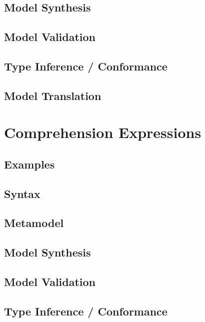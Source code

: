 \documentclass[a4paper,oneside,12pt, extrafontsizes]{memoir}
\begin{document}
    \section{Model Synthesis}

    \section{Model Validation}

    \section{Type Inference / Conformance}

    \section{Model Translation}

  \chapter{Comprehension Expressions}
  \label{ch:comprehensions}
  

    \section{Examples}
    

    \section{Syntax}

    \section{Metamodel}

    \section{Model Synthesis}

    \section{Model Validation}

    \section{Type Inference / Conformance}
\end{document}
